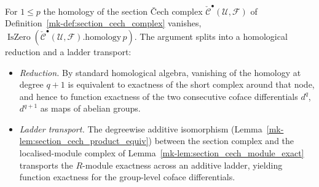 \begin{lemma}
  \label{mk-lem:section_cech_ab_exact}

  For \(1 \leq p\) the homology of the section {\v C}ech complex
  \(\check{\mathcal{C}}^\bullet(\mathcal{U}, \mathcal{F})\) of
  Definition~\ref{mk-def:section_cech_complex} vanishes,
  \(\operatorname{IsZero}(\check{\mathcal{C}}^\bullet(\mathcal{U},
  \mathcal{F}).\mathrm{homology}\, p)\). The argument splits into a homological
  reduction and a ladder transport:
  \begin{itemize}
    \item \emph{Reduction.} By standard homological algebra, vanishing of the
      homology at degree \(q+1\) is equivalent to exactness of the short complex
      around that node, and hence to function exactness of the two consecutive
      coface differentials \(d^q\), \(d^{q+1}\) as maps of abelian groups.
    \item \emph{Ladder transport.} The degreewise additive isomorphism
      (Lemma~\ref{mk-lem:section_cech_product_equiv}) between the section complex and
      the localised-module complex of Lemma~\ref{mk-lem:section_cech_module_exact}
      transports the \(R\)-module exactness across an additive ladder, yielding
      function exactness for the group-level coface differentials.
  \end{itemize}
\end{lemma}


